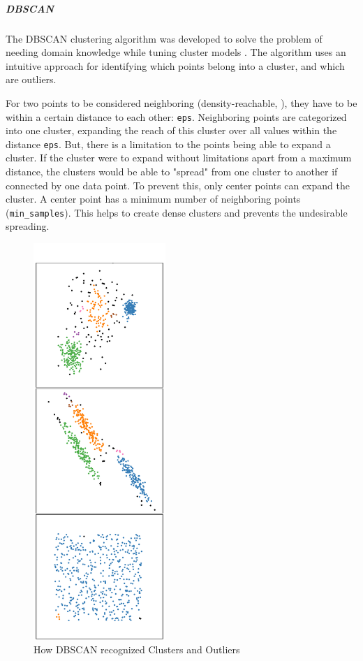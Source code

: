 		\subparagraph{\acl{DBSCAN}}
		The \ac{DBSCAN} clustering algorithm was developed to solve the problem of needing domain knowledge while tuning cluster models \cite{DBSCAN}. The algorithm uses an intuitive approach for identifying which points belong into a cluster, and which are outliers.

		For two points to be considered neighboring (density-reachable, \cite{DBSCAN}), they have to be within a certain distance to each other: \lstinline|eps|. Neighboring points are categorized into one cluster, expanding the reach of this cluster over all values within the distance \lstinline|eps|.
		But, there is a limitation to the points being able to expand a cluster. If the cluster were to expand without limitations apart from a maximum distance, the clusters would be able to "spread" from one cluster to another if connected by one data point.
		To prevent this, only center points can expand the cluster. A center point has a minimum number of neighboring points (\lstinline|min_samples|). This helps to create dense clusters and prevents the undesirable spreading.
		
		 \begin{figure}[!h]
			\centering
			\includegraphics[height=15cm, angle=90]{Bilder/models/dbscan.pdf}
			\caption{How DBSCAN recognized Clusters and Outliers \cite{sklearn}}
			\label{fig:dbscan-viz}
		\end{figure}
	
